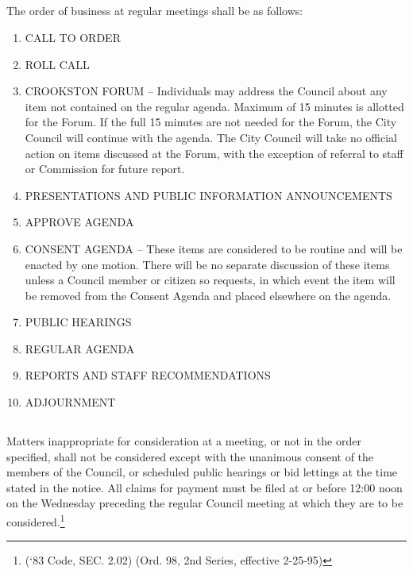 \subsection{}
The order of business at regular meetings shall be as follows:
\begin{enumerate}[{\indent}1)]
    \item CALL TO ORDER
    \item ROLL CALL
    \item CROOKSTON FORUM -- Individuals may address the Council about any item not contained on the regular agenda.   Maximum of 15 minutes is allotted for the Forum.  If the full 15 minutes are not needed for the Forum, the City Council will continue with the agenda.  The City Council will take no official action on items discussed at the Forum, with the exception of referral to staff or Commission for future report.
    \item PRESENTATIONS AND PUBLIC INFORMATION ANNOUNCEMENTS
    \item APPROVE AGENDA
    \item CONSENT AGENDA -- These items are considered to be routine and will be enacted by one motion.  There will be no separate discussion of these items unless a Council member or citizen so requests, in which event the item will be removed from the Consent Agenda and placed elsewhere on the agenda.
    \item PUBLIC HEARINGS
    \item REGULAR AGENDA
    \item REPORTS AND STAFF RECOMMENDATIONS
    \item ADJOURNMENT
\end{enumerate}
\subsection{}
Matters inappropriate for consideration at a meeting, or not in the order specified, shall not be considered except with the unanimous consent of the members of the Council, or scheduled public hearings or bid lettings at the time stated in the notice.  All claims for payment must be filed at or before 12:00 noon on the Wednesday preceding the regular Council meeting at which they are to be considered.\footnote{(‘83 Code, SEC. 2.02)  (Ord. 98, 2nd Series, effective 2-25-95)}

